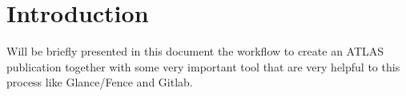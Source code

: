 \section{Introduction}
\label{sec:intro}
Will be briefly presented in this document the workflow to create an ATLAS publication together with some very important tool that are very helpful to this process like Glance/Fence and Gitlab.